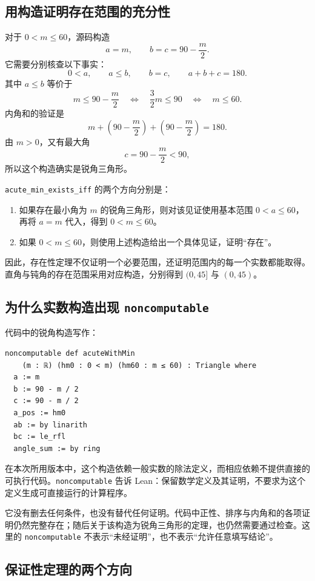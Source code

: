 \documentclass[UTF8,a4paper,zihao=-4,oneside,openany,fontset=fandol]{ctexbook}
\theoremstyle{definition}
\theoremstyle{remark}
\begin{document}
\subsection{用构造证明存在范围的充分性}

对于 $0<m\le60$，源码构造
\[
a=m,\qquad b=c=90-\frac m2.
\]
它需要分别核查以下事实：
\[
0<a,\qquad a\le b,\qquad b=c,\qquad a+b+c=180.
\]
其中 $a\le b$ 等价于
\[
m\le90-\frac m2
\quad\Longleftrightarrow\quad
\frac32m\le90
\quad\Longleftrightarrow\quad
m\le60.
\]
内角和的验证是
\[
m+\left(90-\frac m2\right)
 +\left(90-\frac m2\right)=180.
\]
由 $m>0$，又有最大角
\[
c=90-\frac m2<90,
\]
所以这个构造确实是锐角三角形。

\texttt{acute\_min\_exists\_iff} 的两个方向分别是：
\begin{enumerate}
\item 如果存在最小角为 $m$ 的锐角三角形，则对该见证使用基本范围 $0<a\le60$，再将 $a=m$ 代入，得到 $0<m\le60$。
\item 如果 $0<m\le60$，则使用上述构造给出一个具体见证，证明“存在”。
\end{enumerate}

因此，存在性定理不仅证明一个必要范围，还证明范围内的每一个实数都能取得。直角与钝角的存在范围采用对应构造，分别得到 $(0,45]$ 与 $(0,45)$。

\subsection{为什么实数构造出现 \texttt{noncomputable}}

代码中的锐角构造写作：
\begin{Verbatim}[fontsize=\small,breaklines=true]
noncomputable def acuteWithMin
    (m : ℝ) (hm0 : 0 < m) (hm60 : m ≤ 60) : Triangle where
  a := m
  b := 90 - m / 2
  c := 90 - m / 2
  a_pos := hm0
  ab := by linarith
  bc := le_rfl
  angle_sum := by ring
\end{Verbatim}

在本次所用版本中，这个构造依赖一般实数的除法定义，而相应依赖不提供直接的可执行代码。\texttt{noncomputable} 告诉 Lean：保留数学定义及其证明，不要求为这个定义生成可直接运行的计算程序。

它没有删去任何条件，也没有替代任何证明。代码中正性、排序与内角和的各项证明仍然完整存在；随后关于该构造为锐角三角形的定理，也仍然需要通过检查。这里的 \texttt{noncomputable} 不表示“未经证明”，也不表示“允许任意填写结论”。

\subsection{保证性定理的两个方向}
\end{document}
